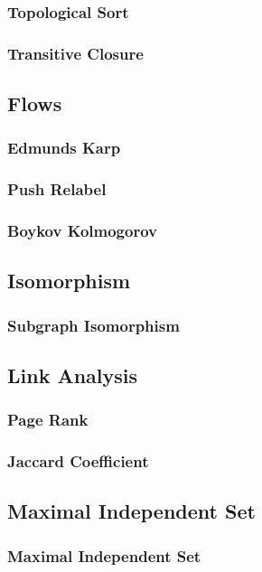 \subsubsection{Topological Sort}
\subsubsection{Transitive Closure}

\subsection{Flows}
\subsubsection{Edmunds Karp}
\subsubsection{Push Relabel}
\subsubsection{Boykov Kolmogorov}

\subsection{Isomorphism}
\subsubsection{Subgraph Isomorphism}

\subsection{Link Analysis}
\subsubsection{Page Rank}
\subsubsection{Jaccard Coefficient}

\subsection{Maximal Independent Set}
\subsubsection{Maximal Independent Set}

